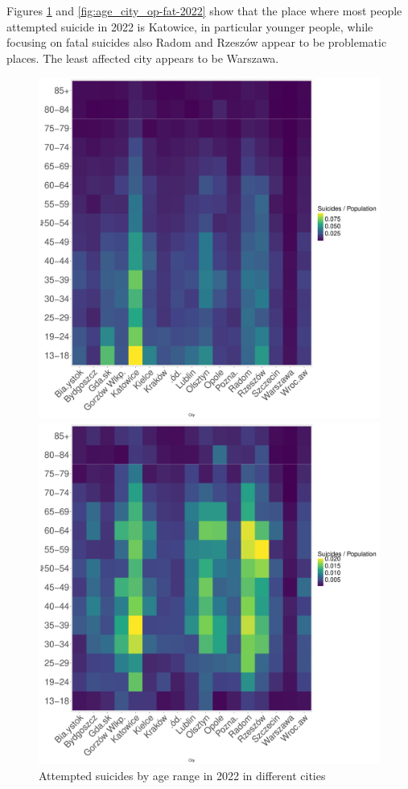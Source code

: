 \documentclass{article}
\begin{document}
Figures \ref{fig:age_city_op-att-2022}
and \ref{fig:age_city_op-fat-2022}
show that
the place where most people attempted suicide in 2022 is Katowice, 
in particular younger people, while focusing on fatal suicides 
also Radom and Rzeszów appear to be problematic places.
The least affected city appears to be Warszawa.
%
\begin{figure}[H]
    \centering
    \begin{minipage}{0.45\textwidth}
        \includegraphics[width=\textwidth]{imgs/age_city_op-att-2022.pdf}
        \caption{Attempted suicides by age range in 2022 in different cities}
	\label{fig:age_city_op-att-2022}
    \end{minipage}
    \hfill
    \begin{minipage}{0.45\textwidth}
        \includegraphics[width=\textwidth]{imgs/age_city_op-fat-2022.pdf}

\end{minipage}
\end{figure}
\end{document}
